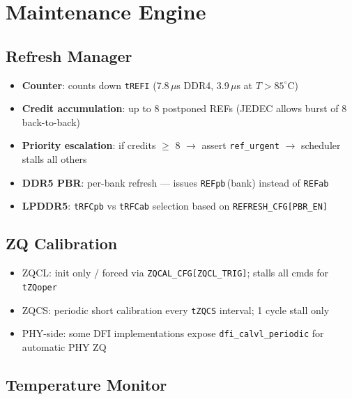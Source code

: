 \documentclass[11pt,a4paper]{article}
\begin{document}
\section{Maintenance Engine}

\subsection{Refresh Manager}

\begin{itemize}
  \item \textbf{Counter}: counts down \texttt{tREFI} (7.8\,$\mu$s DDR4,
        3.9\,$\mu$s at $T > 85^{\circ}$C)
  \item \textbf{Credit accumulation}: up to 8 postponed REFs (JEDEC allows
        burst of 8 back-to-back)
  \item \textbf{Priority escalation}: if credits $\geq$ 8 $\rightarrow$ assert
        \texttt{ref\_urgent} $\rightarrow$ scheduler stalls all others
  \item \textbf{DDR5 PBR}: per-bank refresh — issues
        \texttt{REFpb}\,(bank) instead of \texttt{REFab}
  \item \textbf{LPDDR5}: \texttt{tRFCpb} vs \texttt{tRFCab} selection based on
        \texttt{REFRESH\_CFG[PBR\_EN]}
\end{itemize}

\subsection{ZQ Calibration}

\begin{itemize}
  \item ZQCL: init only / forced via \texttt{ZQCAL\_CFG[ZQCL\_TRIG]};
        stalls all cmds for \texttt{tZQoper}
  \item ZQCS: periodic short calibration every \texttt{tZQCS} interval;
        1 cycle stall only
  \item PHY-side: some DFI implementations expose \texttt{dfi\_calvl\_periodic}
        for automatic PHY ZQ
\end{itemize}

\subsection{Temperature Monitor}
\end{document}
